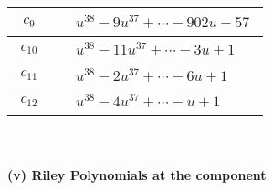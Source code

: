 \documentclass[1p]{elsarticle_modified}
\theoremstyle{definition}
\begin{document}
\begin{tabular}{m{50pt}|m{274pt}}
\hline $$\begin{aligned}c_{9}\end{aligned}$$&$\begin{aligned}
&u^{38}-9 u^{37}+\cdots-902 u+57
\end{aligned}$\\
\hline $$\begin{aligned}c_{10}\end{aligned}$$&$\begin{aligned}
&u^{38}-11 u^{37}+\cdots-3 u+1
\end{aligned}$\\
\hline $$\begin{aligned}c_{11}\end{aligned}$$&$\begin{aligned}
&u^{38}-2 u^{37}+\cdots-6 u+1
\end{aligned}$\\
\hline $$\begin{aligned}c_{12}\end{aligned}$$&$\begin{aligned}
&u^{38}-4 u^{37}+\cdots- u+1
\end{aligned}$\\
\hline
\end{tabular}\\~\\
\newpage\renewcommand{\arraystretch}{1}
\flushleft \textbf{(v) Riley Polynomials at the component}\newline \\
\end{document}
